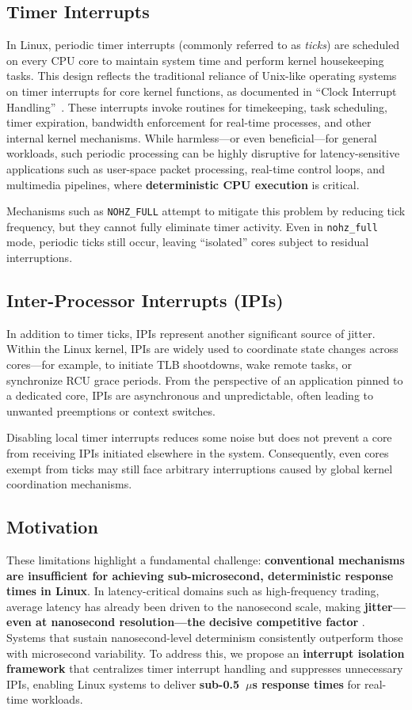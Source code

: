 \documentclass[letterpaper]{article}
\begin{document}
\subsection{Timer Interrupts}
In Linux, periodic timer interrupts (commonly referred to as \emph{ticks})
are scheduled on every CPU core to maintain system time and perform
kernel housekeeping tasks. This design reflects the traditional reliance
of Unix-like operating systems on timer interrupts for core kernel
functions, as documented in 
``Clock Interrupt Handling''~\cite[Section~5.2]{Vahalia96}.
These interrupts invoke routines for timekeeping, task scheduling,
timer expiration, bandwidth enforcement for real-time processes,
and other internal kernel mechanisms. While harmless---or even
beneficial---for general workloads, such periodic processing can
be highly disruptive for latency-sensitive applications such as
user-space packet processing, real-time control loops, and multimedia
pipelines, where \textbf{deterministic CPU execution} is critical.

Mechanisms such as \texttt{NOHZ\_FULL} attempt to mitigate this problem
by reducing tick frequency, but they cannot fully eliminate timer activity.
Even in \texttt{nohz\_full} mode, periodic ticks still occur, leaving
``isolated'' cores subject to residual interruptions.


\subsection{Inter-Processor Interrupts (IPIs)}
In addition to timer ticks, IPIs represent another significant source of 
jitter. Within the Linux kernel, IPIs are widely used to coordinate state 
changes across cores---for example, to initiate TLB shootdowns, 
wake remote tasks, or synchronize RCU grace periods. 
From the perspective of an application pinned to a dedicated core, 
IPIs are asynchronous and unpredictable, often leading to unwanted 
preemptions or context switches.  

Disabling local timer interrupts reduces some noise but does not prevent 
a core from receiving IPIs initiated elsewhere in the system. 
Consequently, even cores exempt from ticks may still face arbitrary 
interruptions caused by global kernel coordination mechanisms.  

\subsection{Motivation}
These limitations highlight a fundamental challenge:
\textbf{conventional mechanisms are insufficient for achieving sub-microsecond, deterministic response times in Linux}.
In latency-critical domains such as high-frequency trading, average latency has already been driven to the nanosecond scale, making \textbf{jitter—even at nanosecond resolution—the decisive competitive factor}  \cite{risk2024ultra}.  Systems that sustain nanosecond-level determinism consistently outperform those with microsecond variability.
To address this, we propose an \textbf{interrupt isolation framework} that centralizes timer interrupt handling and suppresses unnecessary IPIs, enabling Linux systems to deliver \textbf{sub-0.5~$\mu$s response times} for real-time workloads.
\end{document}
